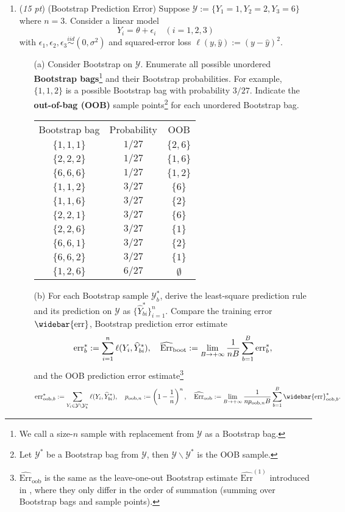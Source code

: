 \documentclass[10pt]{article}
\theoremstyle{definition}
\theoremstyle{remark}
\newcommand{\cY}{\mathcal{Y}}
\newcommand{\err}{\mathrm{err}}		%
\newcommand{\Err}{\mathrm{Err}}		%
\newcommand{\boot}{\mathrm{boot}}	%
\newcommand{\oob}{\mathrm{oob}}		%
\begin{document}
\begin{enumerate}
	\item (\textit{15 pt}) (Bootstrap Prediction Error) Suppose $ \cY := \{Y_{1} = 1, Y_{2} = 2, Y_{3} = 6\} $ where $ n = 3 $. Consider a linear model
	\[ Y_{i} = \theta + \epsilon_{i} \quad(i = 1,2,3) \]
	with $ \epsilon_{1},\epsilon_{2},\epsilon_{3} \overset{iid}{\sim} (0,\sigma^{2}) $ and squared-error loss $ \ell(y,\widehat{y}) := (y - \widehat{y})^{2} $.
	\begin{itemize}
		\item [(a)] Consider Bootstrap on $ \cY $. Enumerate all possible unordered \textbf{Bootstrap bags}\footnote{We call a size-$ n $ sample with replacement from $ \cY $ as a Bootstrap bag.} and their Bootstrap probabilities. For example, $ \{ 1,1,2 \} $ is a possible Bootstrap bag with probability $ 3/27 $. Indicate the \textbf{out-of-bag (OOB)} sample points\footnote{Let $ \cY^{*} $ be a Bootstrap bag from $ \cY $, then $ \cY\backslash\cY^{*} $ is the OOB sample.} for each unordered Bootstrap bag.
		

		\begin{tabular}{c|c|c}
		Bootstrap bag & Probability & OOB  \\
		$\{1,1,1\}$ & $ 1/27 $ & $\{2,6\}$ \\
		$\{2,2,2\}$ & $ 1/27 $ & $\{1,6\}$ \\
		$\{6,6,6\}$ & $ 1/27 $ & $\{1,2\}$ \\
		$\{1,1,2\}$ & $ 3/27 $ & $\{6\}$ \\
		$\{1,1,6\}$ & $ 3/27 $ & $\{2\}$ \\
		$\{2,2,1\}$ & $ 3/27 $ & $\{6\}$ \\
		$\{2,2,6\}$ & $ 3/27 $ & $\{1\}$ \\
		$\{6,6,1\}$ & $ 3/27 $ & $\{2\}$ \\
		$\{6,6,2\}$ & $ 3/27 $ & $\{1\}$ \\
		$\{1,2,6\}$ & $ 6/27 $ & $\emptyset$ \\
		\end{tabular}

		
		\item [(b)] For each Bootstrap sample $ \cY^{*}_{b} $, derive the least-square prediction rule and its prediction on $ \cY $ as $ \{\widehat{Y}_{bi}^{*}\}_{i=1}^{n} $. Compare the training error $ \widebar{\err} $, Bootstrap prediction error estimate 
		\[ \err_{b}^{*} := \sum_{i=1}^{n}\ell(Y_{i},\widehat{Y}_{bi}^{*}), \quad \widehat{\Err}_{\boot} := \lim_{B\to+\infty}{1 \over nB}\sum_{b=1}^{B}\err_{b}^{*}, \]
		and the OOB prediction error estimate\footnote{$ \widehat{\Err}_{\oob} $ is the same as the leave-one-out Bootstrap estimate $ \widehat{\Err}^{(1)} $ introduced in \citet[Equation (7.56)]{friedman2009elements}, where they only differ in the order of summation (summing over Bootstrap bags and sample points).}
		\[ \err^{*}_{\oob,b} := \sum_{Y_{i} \in \cY\backslash\cY^{*}_{b}}\ell(Y_{i},\widehat{Y}_{bi}^{*}), \quad p_{\oob,n} := \left( 1 - {1 \over n} \right)^{n}, \quad \widehat{\Err}_{\oob} := \lim_{B\to+\infty}{1 \over np_{\oob,n}B}\sum_{b=1}^{B}\widebar{\err}_{\oob,b}^{*}. \]
		

\end{itemize}
\end{enumerate}
\end{document}
